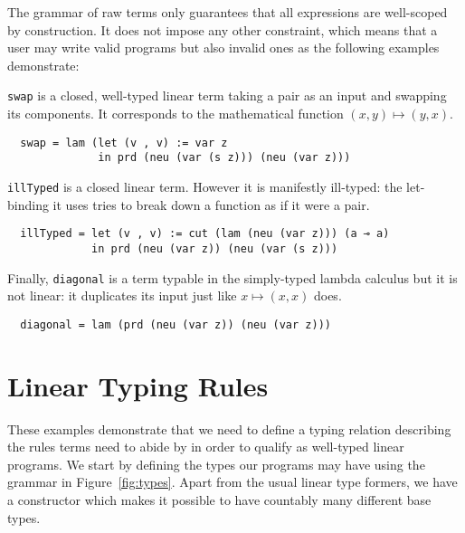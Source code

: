 
The grammar of raw terms only guarantees that all expressions are
well-scoped by construction. It does not impose any other constraint,
which means that a user may write valid programs but also invalid
ones as the following examples demonstrate:

\begin{example}\label{example:swap}
\texttt{swap} is a closed, well-typed linear term taking a pair as
an input and swapping its components. It corresponds to the mathematical
function $(x, y) \mapsto (y, x)$.
\begin{lstlisting}
  swap = lam (let (v , v) := var z
              in prd (neu (var (s z))) (neu (var z)))
\end{lstlisting}
\end{example}

\begin{example}\label{example:illTyped}
\texttt{illTyped} is a closed linear term. However it is manifestly
ill-typed: the let-binding it uses tries to break down a function as
if it were a pair.
\begin{lstlisting}
  illTyped = let (v , v) := cut (lam (neu (var z))) (a ⊸ a)
             in prd (neu (var z)) (neu (var (s z)))
\end{lstlisting}
\end{example}

\begin{example}\label{example:diagonal}
Finally, \texttt{diagonal} is a term typable in the simply-typed
lambda calculus but it is not linear: it duplicates its input just
like $x \mapsto (x, x)$ does.
\begin{lstlisting}
  diagonal = lam (prd (neu (var z)) (neu (var z)))
\end{lstlisting}
\end{example}

\section{Linear Typing Rules}\label{sec:typingrules}

These examples demonstrate that we need to define a typing
relation describing the rules terms need to abide by in order
to qualify as well-typed linear programs. We start by defining
the types our programs may have using the grammar in Figure~\ref{fig:types}.
Apart from the usual linear type formers, we have a constructor
\Base{} which makes it possible to have countably many different
base types.

